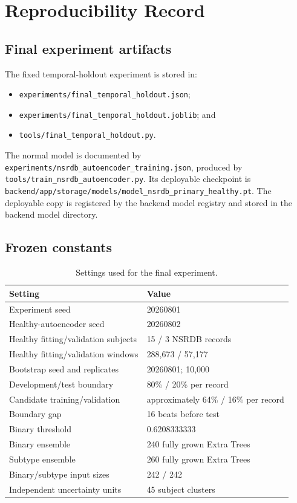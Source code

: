 \chapter{Reproducibility Record}

\section{Final experiment artifacts}

The fixed temporal-holdout experiment is stored in:
\begin{itemize}
    \item \nolinkurl{experiments/final_temporal_holdout.json};
    \item \nolinkurl{experiments/final_temporal_holdout.joblib}; and
    \item \nolinkurl{tools/final_temporal_holdout.py}.
\end{itemize}
The normal model is documented by
\nolinkurl{experiments/nsrdb_autoencoder_training.json}, produced by
\nolinkurl{tools/train_nsrdb_autoencoder.py}. Its deployable checkpoint is
\nolinkurl{backend/app/storage/models/model_nsrdb_primary_healthy.pt}.
The deployable copy is registered by the backend model registry and stored in
the backend model directory.

\section{Frozen constants}

\begin{table}[htbp]
\centering
\caption{Settings used for the final experiment.}
\begin{tabular}{ll}
\toprule
Setting & Value\\
\midrule
Experiment seed & 20260801\\
Healthy-autoencoder seed & 20260802\\
Healthy fitting/validation subjects & 15 / 3 NSRDB records\\
Healthy fitting/validation windows & 288,673 / 57,177\\
Bootstrap seed and replicates & 20260801; 10,000\\
Development/test boundary & 80\% / 20\% per record\\
Candidate training/validation & approximately 64\% / 16\% per record\\
Boundary gap & 16 beats before test\\
Binary threshold & 0.6208333333\\
Binary ensemble & 240 fully grown Extra Trees\\
Subtype ensemble & 260 fully grown Extra Trees\\
Binary/subtype input sizes & 242 / 242\\
Independent uncertainty units & 45 subject clusters\\
\bottomrule
\end{tabular}
\end{table}

